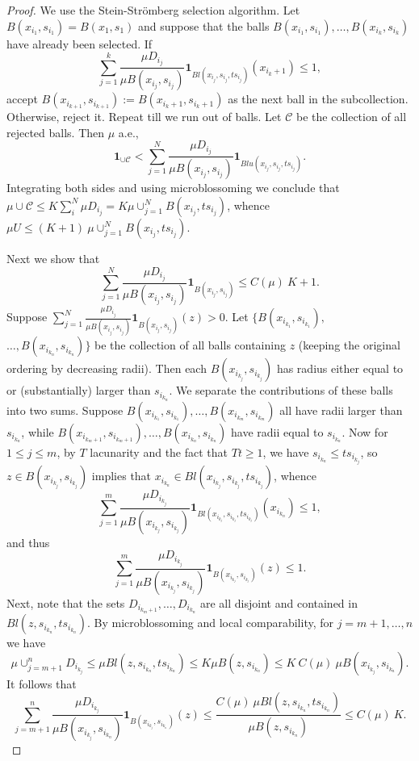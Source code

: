 \documentclass[12pt]{amsart}
\theoremstyle{definition}
\theoremstyle{parrafo}
\begin{document}
 \begin{proof} We use the Stein-Str\"omberg selection algorithm. 
 Let $B(x_{i_1}, s_{i_1}) = B(x_{1}, s_{1})$
 and suppose that the balls $B(x_{i_1}, s_{i_1}), \dots ,B(x_{i_k}, s_{i_k})$ have already been selected. If
 $$ \sum_{j=1}^k \frac{\mu D_{i_j}}{\mu B(x_{i_j}, s_{i_j})}\mathbf{1}_{Bl(x_{i_j}, s_{i_j}, t s_{i_j})} (x_{i_{k} + 1}) \le 1,
$$
accept 
$B(x_{i_{k + 1}}, s_{i_{k + 1}}) := B(x_{i_{k} + 1}, s_{i_{k} + 1})$ as the next ball in the subcollection. Otherwise, reject it. Repeat till we run out of balls.
Let $\mathcal{C}$ be the collection of all rejected balls. Then $\mu$ a.e., 
$$
\mathbf{1}_{\cup \mathcal{C}} < \sum_{j=1}^N \frac{\mu D_{i_j}}{\mu B(x_{i_j}, s_{i_j})}\mathbf{1}_{Blu(x_{i_j}, s_{i_j}, t  s_{i_j})}.
$$
Integrating both sides and using microblossoming we conclude that
$\mu \cup \mathcal{C} \le K \sum_i^N \mu D_{i_j} =  K  \mu \cup_{j=1}^N   B(x_{i_j}, t s_{i_j})$,
whence $\mu U  \le (K + 1)  \ \mu \cup_{j=1}^N   B(x_{i_j}, t s_{i_j})$.

Next we show that $$
\sum_{j=1}^N \frac{\mu D_{i_j}}{\mu B(x_{i_j}, s_{i_j})}\mathbf{1}_{B(x_{i_j}, s_{i_j})}
\le C(\mu) \ K + 1.
$$
Suppose $\sum_{j=1}^N \frac{\mu D_{i_j}}{\mu B(x_{i_j}, s_{i_j})}\mathbf{1}_{B(x_{i_j}, s_{i_j})}(z) > 0$.
Let
$\{B(x_{i_{k_1}}, s_{i_{k_1}}),$ $ \dots, B(x_{i_{k_n}}, s_{i_{k_n}})\}$ be the collection of  all balls containing $z$ (keeping the original ordering by decreasing radii). 
Then each $B(x_{i_{k_j}}, s_{i_{k_j}})$
has radius either
equal to or (substantially) larger than $s_{i_{k_n}}$. We separate the contributions of these balls into two sums.  Suppose $B(x_{i_{k_1}}, s_{i_{k_1}}), \dots , B(x_{i_{k_m}}, s_{i_{k_m}})$ all have radii larger than $s_{i_{k_n}}$, while $B(x_{i_{k_{m} + 1}}, s_{i_{k_{m} + 1}}), \dots , B(x_{i_{k_n}}, s_{i_{k_n}})$
have radii equal to $s_{i_{k_{n}}}$. Now for $1 \le j \le m$, by $T$ lacunarity and the fact that $T t \ge 1$, we have
$s_{i_{k_n}} \le t s_{i_{k_j}}$, so $z\in B(x_{i_{k_j}}, s_{i_{k_j}})$ implies that 
$x_{i_{k_n}}\in Bl(x_{i_{k_j}}, s_{i_{k_j}}, t s_{i_{k_j}})$,
whence 
$$ 
\sum_{j=1}^m \frac{\mu D_{i_{k_j}}}{\mu B(x_{i_{k_j}}, s_{i_{k_j}})}
\mathbf{1}_{Bl(x_{i_{k_j}}, s_{i_{k_j}}, t s_{i_{k_j}})} (x_{i_{k_n}}) \le 1,
$$
and thus  
$$ 
\sum_{j=1}^m \frac{\mu D_{i_{k_j}}}{\mu B(x_{i_{k_j}}, s_{i_{k_j}})}
\mathbf{1}_{B(x_{i_{k_j}}, s_{i_{k_j}})}  (z) \le 1.
$$
Next, note that the sets $D_{i_{k_{m} + 1}}, \dots , D_{i_{k_{n}}}$ are all disjoint and contained in 
$Bl(z, s_{i_{k_{n}}}, t s_{i_{k_{n}}})$. By microblossoming and local comparability, for $j = m + 1, \dots, n$ we have
$$
\mu \cup_{j= m+1}^n  D_{i_{k_{j}}}\le \mu Bl(z, s_{i_{k_{n}}}, t s_{i_{k_{n}}}) \le  
K \mu B(z, s_{i_{k_{n}}})\le  K \  C(\mu) \  \mu B(x_{i_{k_{j}}}, s_{i_{k_{n}}}).
$$ 
It follows that 
$$
\sum_{j= m +1}^n \frac{\mu D_{i_{k_{j}}}}{\mu B(x_{i_{k_{j}}},  s_{i_{k_{n}}})}\mathbf{1}_{B(x_{i_{k_{j}}},   
 s_{i_{k_{n}}})} (z)
\le
\frac{ C(\mu) \ \mu Bl(z, s_{i_{k_{n}}}, t s_{i_{k_{n}}})}{\mu B(z, s_{i_{k_{n}}})}
\le C(\mu)  \ K.
 $$
 \end{proof}
 
\end{document}
